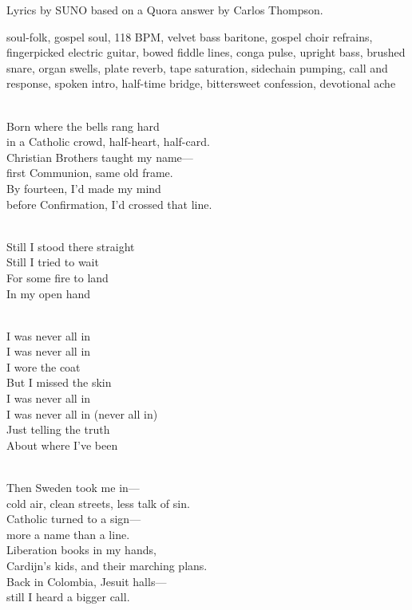 

\begin{notes}
Lyrics by SUNO based on a Quora answer by Carlos Thompson.
\end{notes}

\begin{style}
soul-folk, gospel soul, 118 BPM, velvet bass baritone, gospel choir refrains, fingerpicked electric guitar, bowed fiddle lines, conga pulse, upright bass, brushed snare, organ swells, plate reverb, tape saturation, sidechain pumping, call and response, spoken intro, half-time bridge, bittersweet confession, devotional ache
\end{style}

\begin{lyrics}
\\
Born where the bells rang hard\\
in a Catholic crowd, half-heart, half-card.\\
Christian Brothers taught my name—\\
first Communion, same old frame.\\
By fourteen, I’d made my mind\\
before Confirmation, I’d crossed that line.

\\
Still I stood there straight\\
Still I tried to wait\\
For some fire to land\\
In my open hand

\\
I was never all in\\
I was never all in\\
I wore the coat\\
But I missed the skin\\
I was never all in\\
I was never all in
(never all in)\\
Just telling the truth\\
About where I’ve been

\\
Then Sweden took me in—\\
cold air, clean streets, less talk of sin.\\
Catholic turned to a sign—\\
more a name than a line.\\
Liberation books in my hands,\\
Cardijn’s kids, and their marching plans.\\
Back in Colombia, Jesuit halls—\\
still I heard a bigger call.


\end{lyrics}
